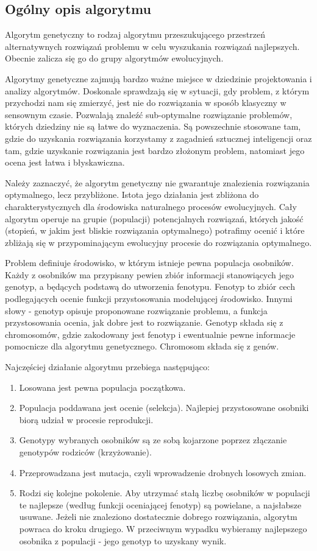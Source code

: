 \documentclass[11pt]{report}
\begin{document}
\subsection{Ogólny opis algorytmu}
\par Algorytm genetyczny to rodzaj algorytmu przeszukującego przestrzeń alternatywnych rozwiązań problemu w celu wyszukania rozwiązań najlepszych. Obecnie zalicza się go do grupy algorytmów ewolucyjnych.
\par Algorytmy genetyczne zajmują bardzo ważne miejsce w dziedzinie projektowania i analizy algorytmów. Doskonale sprawdzają się w sytuacji, gdy problem, z którym przychodzi nam się zmierzyć, jest nie do rozwiązania w sposób klasyczny w sensownym czasie. Pozwalają znaleźć sub-optymalne rozwiązanie problemów, których dziedziny nie są łatwe do wyznaczenia. Są powszechnie stosowane tam, gdzie do uzyskania rozwiązania korzystamy z zagadnień sztucznej inteligencji oraz tam, gdzie uzyskanie rozwiązania jest bardzo złożonym problem, natomiast jego ocena jest łatwa i błyskawiczna.
\par Należy zaznaczyć, że algorytm genetyczny nie gwarantuje znalezienia rozwiązania optymalnego, lecz przybliżone. Istota jego działania jest zbliżona do charakterystycznych dla środowiska naturalnego procesów ewolucyjnych. Cały algorytm operuje na grupie (populacji) potencjalnych rozwiązań, których jakość (stopień, w jakim jest bliskie rozwiązania optymalnego) potrafimy ocenić i które zbliżają się w przypominającym ewolucyjny procesie do rozwiązania optymalnego.
\par Problem definiuje środowisko, w którym istnieje pewna populacja osobników. Każdy z osobników ma przypisany pewien zbiór informacji stanowiących jego genotyp, a będących podstawą do utworzenia fenotypu. Fenotyp to zbiór cech podlegających ocenie funkcji przystosowania modelującej środowisko. Innymi słowy - genotyp opisuje proponowane rozwiązanie problemu, a funkcja przystosowania ocenia, jak dobre jest to rozwiązanie. Genotyp składa się z chromosomów, gdzie zakodowany jest fenotyp i ewentualnie pewne informacje pomocnicze dla algorytmu genetycznego. Chromosom składa się z genów.
\par Najczęściej działanie algorytmu przebiega następująco:
\begin{enumerate}
\item Losowana jest pewna populacja początkowa.
\item Populacja poddawana jest ocenie (selekcja). Najlepiej przystosowane osobniki biorą udział w procesie reprodukcji.
\item Genotypy wybranych osobników są ze sobą kojarzone poprzez złączanie genotypów rodziców (krzyżowanie).
\item Przeprowadzana jest mutacja, czyli wprowadzenie drobnych losowych zmian.
\item Rodzi się kolejne pokolenie. Aby utrzymać stałą liczbę osobników w populacji te najlepsze (według funkcji oceniającej fenotyp) są powielane, a najsłabsze usuwane. Jeżeli nie znaleziono dostatecznie dobrego rozwiązania, algorytm powraca do kroku drugiego. W przeciwnym wypadku wybieramy najlepszego osobnika z populacji - jego genotyp to uzyskany wynik.
\end{enumerate}
\end{document}
